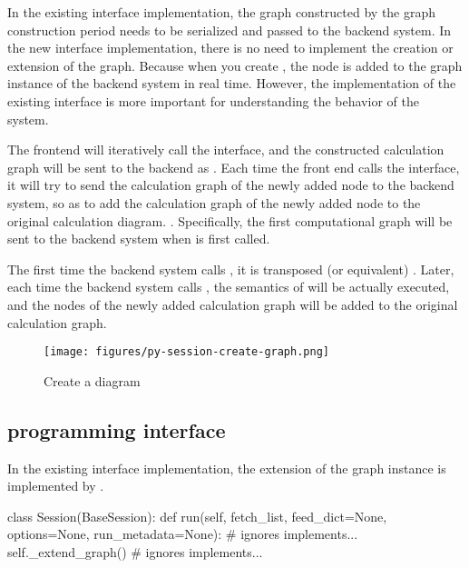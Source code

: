 \begin{content}

In the existing interface implementation, the graph constructed by the graph construction period needs to be serialized and passed to the backend  system. In the new interface implementation, there is no need to implement the creation or extension of the graph. Because when you create , the node is added to the graph instance of the backend  system in real time. However, the implementation of the existing interface is more important for understanding the behavior of the system.

The  frontend will iteratively call the  interface, and the constructed calculation graph will be sent to the \cpp{} backend as . Each time the front end calls the  interface, it will try to send the calculation graph of the newly added node to the backend system, so as to add the calculation graph  of the newly added node to the original calculation diagram. . Specifically, the first computational graph will be sent to the backend system when  is first called.

The first time the backend system calls , it is transposed (or equivalent) . Later, each time the backend system calls , the semantics of  will be actually executed, and the nodes of the newly added calculation graph will be added to the original calculation graph.

\begin{figure}[H]
\centering
\texttt{[image: figures/py-session-create-graph.png]}
\caption{Create a diagram}
 \label{fig:py-session-create-graph}
\end{figure}

\subsection{programming interface}

In the existing interface implementation, the extension of the graph instance is implemented by .

\begin{leftbar}
\begin{python}[caption={tensorflow/python/client/session.py}]
class Session(BaseSession):
  def run(self, fetch_list, feed_dict=None, options=None, run_metadata=None):
    # ignores implements...
    self._extend_graph()
    # ignores implements...


\end{python}
\end{leftbar}
\end{content}
